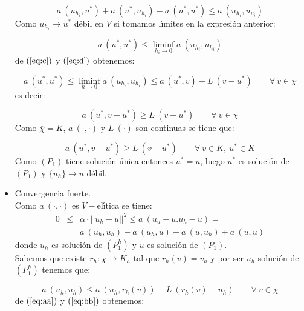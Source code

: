 \begin{demosteorema}
\begin{itemize}
\begin{displaymath}
a\ (u_{h_i},u^*)+a\ (u^*,u_{h_i})-a\ (u^*,u^*) \le a\ (u_{h_i},u_{u_i})
\end{displaymath}
Como $u_{h_i} \to u^*$ d\'ebil en $V$ si tomamos l\'{\i}mites en la expresi\'on
anterior:

\begin{equation} \label{eq:d}
a\ (u^*,u^*)\le \liminf_{h_i \to 0} a\ (u_{h_i},u_{h_i})
\end{equation}
de $(\ref{eq:c})$ y $(\ref{eq:d})$ obtenemos:

\begin{displaymath}
a\ (u^*,u^*) \le \liminf_{h\to 0} a\ (u_{h_i},u_{h_i})\le a\ (u^*,v)-
L\ (v-u^*)\qquad \forall \ v \in \chi
\end{displaymath}
es decir:

\begin{displaymath}
a\ (u^*,v-u^*)\ge L\ (v-u^*)\qquad \forall \ v \in \chi
\end{displaymath}
Como $\overline{\chi }=K$, $a\ (\cdot ,\cdot )$ y $L\ (\cdot )$ son continuas se
tiene que:

\begin{displaymath}
a\ (u^*,v-u^*)\ge L\ (v-u^*)\qquad \forall \ v \in K,\ u^* \in K
\end{displaymath}
Como $(P_1)$ tiene soluci\'on \'unica entonces $u^*=u$, luego $u^*$ es
soluci\'on de $(P_1)$ y $\{ u_h \}\longrightarrow u$ d\'ebil.

\item Convergencia fuerte.\\

Como $a\ (\cdot ,\cdot )$ es $V-$el\'{\i}tica se tiene:
\begin{eqnarray}\label{eq:aa}
0 &\le & \alpha \cdot ||u_h-u||^2\le a\ (u_u-u.u_h-u) =\\ \nonumber
  &= & a\ (u_h,u_h)-a\ (u_h,u)-a\ (u,u_h)+a\ (u,u)
\end{eqnarray}
donde $u_h$ es soluci\'on de $(P^h_1)$ y $u$ es soluci\'on de $(P_1)$.\\

Sabemos que existe $r_h:\chi\longrightarrow K_h$ tal que $r_h(v)=v_h$ y por
ser $u_h$ soluci\'on de $(P_1^h)$ tenemos que:

\begin{equation}\label{eq:bb}
a\ (u_h,u_h)\le a\ (u_h,r_h(v))-L\ (r_h(v)-u_h)\qquad \forall \ v \in \chi
\end{equation}
de $(\ref{eq:aa})$ y $(\ref{eq:bb})$ obtenemos:


\end{itemize}
\end{demosteorema}
